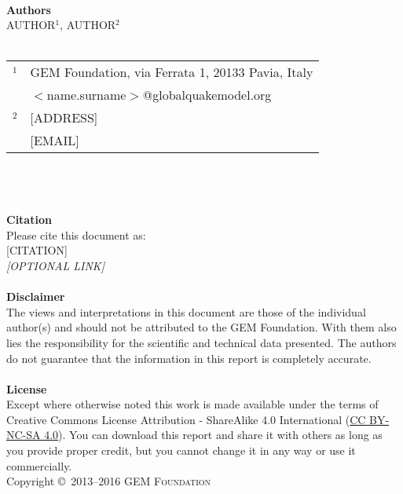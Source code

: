 \newpage
~\vfill
\thispagestyle{empty}

\noindent
  \textbf{Authors} \\
  AUTHOR$^1$, AUTHOR$^2$ \hfill \\
  \hfill \\
  \small
  \begin{tabular}{l l}
    $^1$ & GEM Foundation, via Ferrata 1, 20133 Pavia, Italy \\
         & $<$name.surname$>$@globalquakemodel.org \\
    $^2$ & [ADDRESS] \\
         & [EMAIL] \\
  \end{tabular} \\
  \hfill \\
  \normalsize
\noindent \hfill \\
\noindent
   {\textbf{Citation}} \hfill \\
   Please cite this document as: \hfill \\
   {[CITATION]} \hfill \\
   \textit{[OPTIONAL LINK]} \hfill \\
\noindent \hfill \\
\noindent
   {\bf{Disclaimer}} \hfill \\
   The views and interpretations in this document are those of the individual
   author(s) and should not be attributed to the GEM Foundation. With them also
   lies the responsibility for the scientific and technical data presented.
   The authors do not guarantee that the information in this report is completely
   accurate. \hfill \\
\noindent \hfill \\
\noindent
   {\bf{License}} \hfill \\
   Except where otherwise noted this work is made available under the terms of
   Creative Commons License  Attribution - ShareAlike 4.0 International
   (\href{http://creativecommons.org/licenses/by-nc-sa/4.0/} {CC BY-NC-SA 4.0}).
   You can download this report and share it with others as long as you
   provide proper credit, but you cannot change it in any way or use it
   commercially.\hfill \\

\noindent Copyright \copyright\ \textsc{2013--2016 GEM Foundation} \\
